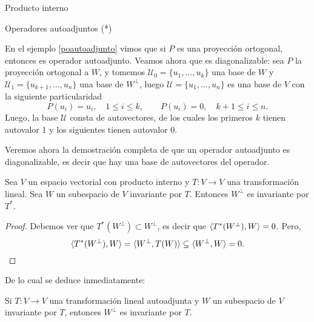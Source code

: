 \begin{chapter}{Producto interno}
\begin{section}{Operadores autoadjuntos (*)}
        
        \begin{ejemplo*}
            En el ejemplo \ref{poautoadjunto} vimos que si  $P$ es una proyección ortogonal, entonces es  operador autoadjunto. Veamos ahora que es diagonalizable: sea $P$ la proyección ortogonal a $W$, y tomemos $\mathcal{U}_0 = \{u_1,\ldots,u_k\}$ una base de $W$ y  $\mathcal{U}_1 = \{u_{k+1},\ldots,u_n\}$ una base de $W^\perp$, luego $\mathcal{U} = \{u_1,\ldots,u_n\}$ es una base de $V$ con la siguiente particularidad
            $$
            P(u_i) = u_i,\quad 1 \le i \le k, \qquad P(u_i) = 0,\quad k+1 \le i \le n.
            $$
            Luego, la base $\mathcal{U}$ consta de autovectores, de los  cuales los primeros $k$ tienen autovalor 1 y los siguientes tienen autovalor 0.
        \end{ejemplo*}
        
                
        Veremos ahora la demostración completa de que un operador autoadjunto es diagonalizable, es decir que hay una base de autovectores del operador. 

        \begin{proposicion}
                Sea $V$ un espacio vectorial con producto interno y $T: V \to V$ una transformación lineal. Sea $W$ un subespacio de $V$ invariante por $T$. Entonces $W^\perp$ es invariante por $T^*$.
        \end{proposicion}
        \begin{proof}
            Debemos ver que $T^*(W^\perp) \subset W^\perp$, es decir que $\langle T^*(W^\perp) , W \rangle = 0$. Pero,
            $$
            \langle T^*(W^\perp) , W \rangle = \langle W^\perp, T(W) \rangle \subseteq  \langle W^\perp, W \rangle =0.
            $$  
        \end{proof}
        
        De lo cual se deduce inmediatamente:
        
        \begin{corolario}\label{wperpinv}
            Si  $T: V \to V$ una transformación lineal autoadjunta y $W$ un subespacio de $V$ invariante por $T$, entonces $W^\perp$ es invariante por $T$.
        \end{corolario}
        

\end{section}
\end{chapter}
